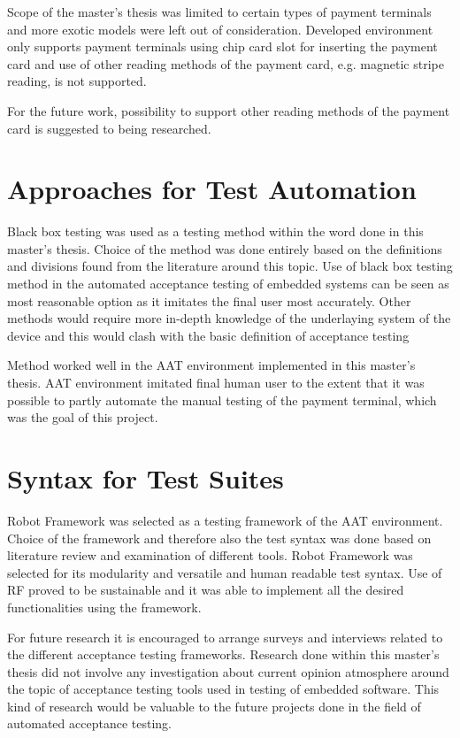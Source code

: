Scope of the master's thesis was limited to certain types of payment terminals and more exotic models were left out of consideration. Developed environment only supports payment terminals using chip card slot for inserting the payment card and use of other reading methods of the payment card, e.g. magnetic stripe reading, is not supported.

For the future work, possibility to support other reading methods of the payment card is suggested to being researched.

\section{Approaches for Test Automation}

Black box testing was used as a testing method within the word done in this master's thesis. Choice of the method was done entirely based on the definitions and divisions found from the literature around this topic. Use of black box testing method in the automated acceptance testing of embedded systems can be seen as most reasonable option as it imitates the final user most accurately. Other methods would require more in-depth knowledge of the underlaying system of the device and this would clash with the basic definition of acceptance testing

Method worked well in the AAT environment implemented in this master's thesis. AAT environment imitated final human user to the extent that it was possible to partly automate the manual testing of the payment terminal, which was the goal of this project.

\section{Syntax for Test Suites}

Robot Framework was selected as a testing framework of the AAT environment. Choice of the framework and therefore also the test syntax was done based on literature review and examination of different tools. Robot Framework was selected for its modularity and versatile and human readable test syntax. Use of RF proved to be sustainable and it was able to implement all the desired functionalities using the framework.

For future research it is encouraged to arrange surveys and interviews related to the different acceptance testing frameworks. Research done within this master's thesis did not involve any investigation about current opinion atmosphere around the topic of acceptance testing tools used in testing of embedded software. This kind of research would be valuable to the future projects done in the field of automated acceptance testing.



